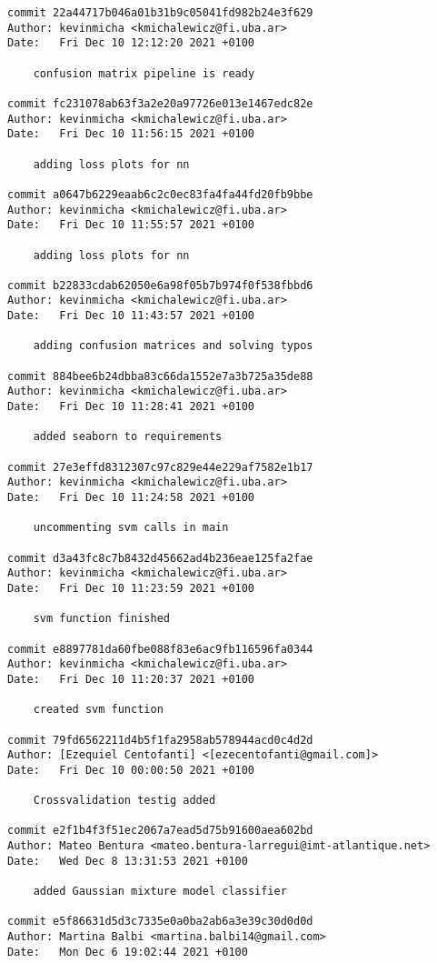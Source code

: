 \documentclass[11pt,a4paper]{article}
\begin{document}
\begin{IMTAannexes}
\begin{verbatim}
commit 22a44717b046a01b31b9c05041fd982b24e3f629
Author: kevinmicha <kmichalewicz@fi.uba.ar>
Date:   Fri Dec 10 12:12:20 2021 +0100

    confusion matrix pipeline is ready

commit fc231078ab63f3a2e20a97726e013e1467edc82e
Author: kevinmicha <kmichalewicz@fi.uba.ar>
Date:   Fri Dec 10 11:56:15 2021 +0100

    adding loss plots for nn

commit a0647b6229eaab6c2c0ec83fa4fa44fd20fb9bbe
Author: kevinmicha <kmichalewicz@fi.uba.ar>
Date:   Fri Dec 10 11:55:57 2021 +0100

    adding loss plots for nn

commit b22833cdab62050e6a98f05b7b974f0f538fbbd6
Author: kevinmicha <kmichalewicz@fi.uba.ar>
Date:   Fri Dec 10 11:43:57 2021 +0100

    adding confusion matrices and solving typos

commit 884bee6b24dbba83c66da1552e7a3b725a35de88
Author: kevinmicha <kmichalewicz@fi.uba.ar>
Date:   Fri Dec 10 11:28:41 2021 +0100

    added seaborn to requirements

commit 27e3effd8312307c97c829e44e229af7582e1b17
Author: kevinmicha <kmichalewicz@fi.uba.ar>
Date:   Fri Dec 10 11:24:58 2021 +0100

    uncommenting svm calls in main

commit d3a43fc8c7b8432d45662ad4b236eae125fa2fae
Author: kevinmicha <kmichalewicz@fi.uba.ar>
Date:   Fri Dec 10 11:23:59 2021 +0100

    svm function finished

commit e8897781da60fbe088f83e6ac9fb116596fa0344
Author: kevinmicha <kmichalewicz@fi.uba.ar>
Date:   Fri Dec 10 11:20:37 2021 +0100

    created svm function

commit 79fd6562211d4b5f1fa2958ab578944acd0c4d2d
Author: [Ezequiel Centofanti] <[ezecentofanti@gmail.com]>
Date:   Fri Dec 10 00:00:50 2021 +0100

    Crossvalidation testig added

commit e2f1b4f3f51ec2067a7ead5d75b91600aea602bd
Author: Mateo Bentura <mateo.bentura-larregui@imt-atlantique.net>
Date:   Wed Dec 8 13:31:53 2021 +0100

    added Gaussian mixture model classifier

commit e5f86631d5d3c7335e0a0ba2ab6a3e39c30d0d0d
Author: Martina Balbi <martina.balbi14@gmail.com>
Date:   Mon Dec 6 19:02:44 2021 +0100


\end{verbatim}
\end{IMTAannexes}
\end{document}
